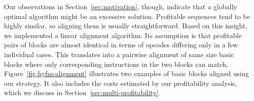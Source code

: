 \label{sec:pa-alignment}

Our observations in Section~\ref{sec:motivation}, though, indicate that a globally optimal algorithm might be an excessive solution. %
Profitable sequences tend to be highly similar, so aligning them is usually straightforward. Based on this insight, we implemented a linear alignment algorithm. Its assumption is that profitable pairs of blocks are almost identical in terms of opcodes differing only in a few individual cases. This translates into a pairwise alignment of same size basic blocks where only corresponding instructions in the two blocks can match. Figure~\ref{fig:hyfm-alignment} illustrates two examples of basic blocks aligned using our strategy.
It also includes the costs estimated by our profitability analysis, which we discuss in Section~\ref{sec:multi-profitability}.


